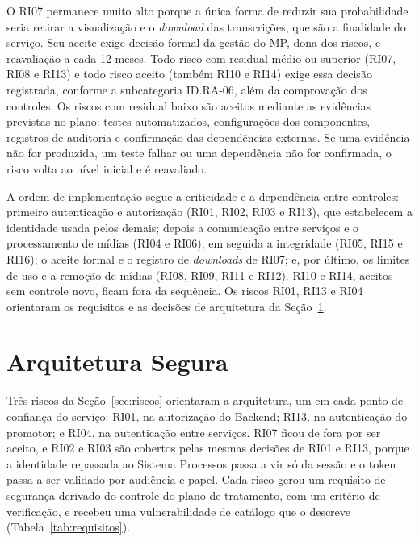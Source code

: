 \documentclass[12pt]{article}
\begin{document}
    O RI07 permanece muito alto porque a única forma de reduzir sua probabilidade seria retirar a visualização e o \textit{download} das transcrições, que são a finalidade do serviço. Seu aceite exige decisão formal da gestão do MP, dona dos riscos, e reavaliação a cada 12 meses. Todo risco com residual médio ou superior (RI07, RI08 e RI13) e todo risco aceito (também RI10 e RI14) exige essa decisão registrada, conforme a subcategoria ID.RA-06, além da comprovação dos controles. Os riscos com residual baixo são aceitos mediante as evidências previstas no plano: testes automatizados, configurações dos componentes, registros de auditoria e confirmação das dependências externas. Se uma evidência não for produzida, um teste falhar ou uma dependência não for confirmada, o risco volta ao nível inicial e é reavaliado.

    A ordem de implementação segue a criticidade e a dependência entre controles: primeiro autenticação e autorização (RI01, RI02, RI03 e RI13), que estabelecem a identidade usada pelos demais; depois a comunicação entre serviços e o processamento de mídias (RI04 e RI06); em seguida a integridade (RI05, RI15 e RI16); o aceite formal e o registro de \textit{downloads} de RI07; e, por último, os limites de uso e a remoção de mídias (RI08, RI09, RI11 e RI12). RI10 e RI14, aceitos sem controle novo, ficam fora da sequência. Os riscos RI01, RI13 e RI04 orientaram os requisitos e as decisões de arquitetura da Seção~\ref{sec:arquitetura-segura}.

    \section{Arquitetura Segura}
    \label{sec:arquitetura-segura}

    Três riscos da Seção~\ref{sec:riscos} orientaram a arquitetura, um em cada ponto de confiança do serviço: RI01, na autorização do Backend; RI13, na autenticação do promotor; e RI04, na autenticação entre serviços. RI07 ficou de fora por ser aceito, e RI02 e RI03 são cobertos pelas mesmas decisões de RI01 e RI13, porque a identidade repassada ao Sistema Processos passa a vir só da sessão e o token passa a ser validado por audiência e papel. Cada risco gerou um requisito de segurança derivado do controle do plano de tratamento, com um critério de verificação, e recebeu uma vulnerabilidade de catálogo que o descreve (Tabela~\ref{tab:requisitos}).
\end{document}
